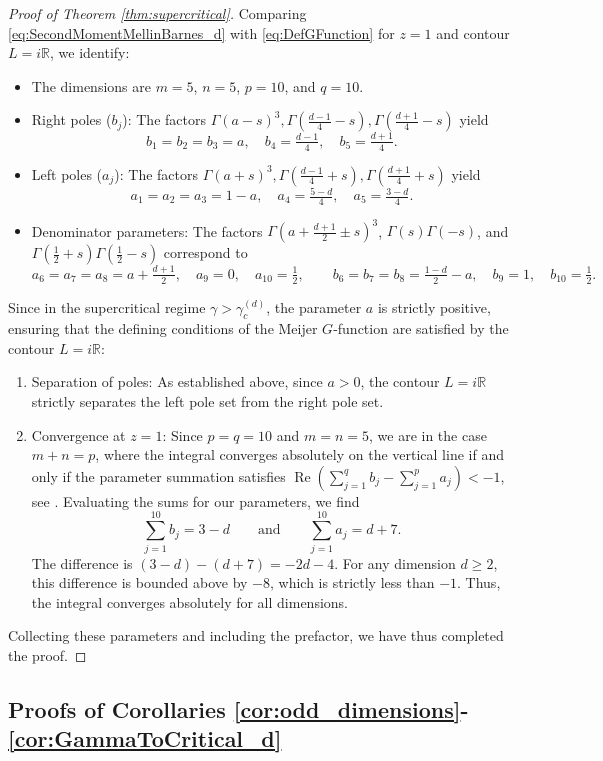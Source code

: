 \documentclass[11pt,a4paper]{article}
\theoremstyle{plain}
\theoremstyle{definition}
\theoremstyle{remark}
\def\RR{\mathbb{R}}
\begin{document}
\begin{proof}[Proof of Theorem \ref{thm:supercritical}]
Comparing \eqref{eq:SecondMomentMellinBarnes_d} with \eqref{eq:DefGFunction} for $z=1$ and contour $L=i\RR$, we identify:
\begin{itemize}
	\item The dimensions are $m=5$, $n=5$, $p=10$, and $q=10$.
	\item Right poles ($b_j$): The factors $\Gamma(a-s)^3, \Gamma(\frac{d-1}{4}-s), \Gamma(\frac{d+1}{4}-s)$ yield
	\[ b_1=b_2=b_3=a,\quad b_4=\tfrac{d-1}{4},\quad b_5=\tfrac{d+1}{4}. \]
	\item Left poles ($a_j$): The factors $\Gamma(a+s)^3, \Gamma(\frac{d-1}{4}+s), \Gamma(\frac{d+1}{4}+s)$ yield
	\[ a_1=a_2=a_3=1-a,\quad a_4=\tfrac{5-d}{4},\quad a_5=\tfrac{3-d}{4}. \]
	\item Denominator parameters: The factors $\Gamma(a+\frac{d+1}{2}\pm s)^3$, $\Gamma(s)\Gamma(-s)$, and
	$\Gamma(\frac12+s)\Gamma(\frac12-s)$ correspond to
	\[
	a_6=a_7=a_8=a+\tfrac{d+1}{2},\quad a_9=0,\quad a_{10}=\tfrac12,
	\qquad
	b_6=b_7=b_8=\tfrac{1-d}{2}-a,\quad b_9=1,\quad b_{10}=\tfrac12 .
	\]
\end{itemize}
Since in the supercritical regime $\gamma>\gamma_c^{(d)}$, the parameter $a$ is strictly positive, ensuring that the defining conditions of the Meijer $G$-function are satisfied by the contour $L=i\RR$:
\begin{enumerate}
	\item Separation of poles: As established above, since $a>0$, the contour $L=i\RR$ strictly separates the left pole set from the right pole set.
	\item Convergence at $z=1$: Since $p=q=10$ and $m=n=5$, we are in the case $m+n=p$, where the integral converges absolutely on the vertical line if and only if the parameter summation satisfies $\operatorname{Re}(\sum_{j=1}^q b_j - \sum_{j=1}^p a_j) < -1$, see \cite[Section 1.1]{MathaiSaxena}. Evaluating the sums for our parameters, we find
	\[
	\sum_{j=1}^{10} b_j = 3-d \qquad \text{and} \qquad \sum_{j=1}^{10} a_j = d+7.
	\]
	The difference is $(3-d) - (d+7) = -2d - 4$. For any dimension $d \ge 2$, this difference is bounded above by $-8$, which is strictly less than $-1$. Thus, the integral converges absolutely for all dimensions.
\end{enumerate}
Collecting these parameters and including the prefactor, we have thus completed the proof.
\end{proof}

\subsection{Proofs of Corollaries \ref{cor:odd_dimensions}-\ref{cor:GammaToCritical_d}}
\end{document}
